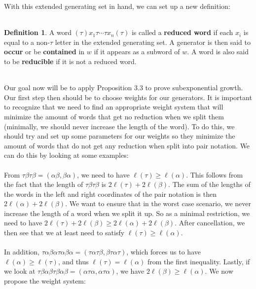 \documentclass[11pt]{amsart}
\theoremstyle{definition}
\newtheorem{definition}[theorem]{Definition}
\theoremstyle{remark}
\numberwithin{equation}{section}
\begin{document}
\vspace{10mm}
With this extended generating set in hand, we can set up a new definition: \\ \\
\begin{definition}
A word $(\tau) x_{1} \tau \cdots \tau x_{n} (\tau)$ is called a \textbf{reduced word} if each $x_{i}$ is equal to a non-$\tau$ letter in the extended generating set. A generator is then said to \textbf{occur} or be \textbf{contained} in $w$ if it appears as a subword of $w$.  A word is also said to be \textbf{reducible} if it is not a reduced word. \\ \\
\end{definition}
Our goal now will be to apply Proposition 3.3 to prove subexponential growth. Our first step then should be to choose weights for our generators. It is important to recognize that we need to find an appropriate weight system that will minimize the amount of words that get no reduction when we split them (minimally, we should never increase the length of the word). To do this, we should try and set up some parameters for our weights so they minimize the amount of words that do not get any reduction when split into pair notation. We can do this by looking at some examples: \\ \\
From $\tau \beta \tau \beta = (\alpha \beta, \beta \alpha)$, we need to have $\ell(\tau) \geq \ell(\alpha)$. This follows from the fact that the length of $\tau \beta \tau \beta$ is $2 \ell(\tau) + 2 \ell(\beta)$. The sum of the lengths of the words in the left and right coordinates of the pair notation is then $2 \ell(\alpha) + 2 \ell(\beta)$. We want to ensure that in the worst case scenario, we never increase the length of a word when we split it up. So as a minimal restriction, we need to have $2 \ell(\tau) + 2 \ell(\beta) \geq 2 \ell(\alpha) + 2 \ell(\beta)$. After cancellation, we then see that we at least need to satisfy $\ell(\tau) \geq \ell(\alpha)$.  \\ \\
In addition, $\tau \alpha \beta \alpha \tau \alpha \beta \alpha = (\tau \alpha \tau \beta, \beta \tau \alpha \tau)$, which forces us to have $\ell(\alpha) \geq \ell(\tau)$, and thus $\ell(\tau) = \ell(\alpha)$ from the first inequality. Lastly, if we look at $\tau \beta \alpha \beta \tau \beta \alpha \beta  = ( \alpha \tau \alpha, \alpha \tau \alpha) $, we have $ 2\ell(\beta) \geq \ell(\alpha)$. We now propose the weight system: \\ \\
\end{document}
